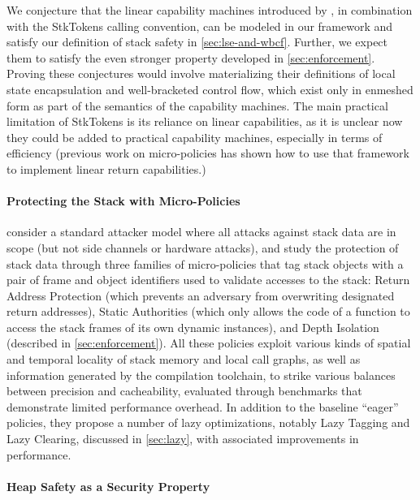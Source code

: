 \documentclass[acmsmall,review,anonymous]{acmart}\settopmatter{printfolios=true,printccs=false,printacmref=false}
\begin{document}
We conjecture that the linear capability machines introduced by
\citep{Skorstengaard+19}, in combination with the StkTokens calling convention,
can be modeled in our framework and satisfy our definition of stack safety in
\cref{sec:lse-and-wbcf}. Further, we expect them to satisfy the even stronger
property developed in \cref{sec:enforcement}. Proving these conjectures would
involve materializing their definitions of local state encapsulation and
well-bracketed control flow, which exist only in enmeshed form as part of the
semantics of the capability machines. The main practical limitation of StkTokens
is its reliance on linear capabilities, as it is unclear now they could be added
to practical capability machines, especially in terms of efficiency (previous
work on micro-policies \citep{yannis-report} has shown how to use that framework
to implement linear return capabilities.)

\paragraph{Protecting the Stack with Micro-Policies}
%
\citet{DBLP:conf/sp/RoesslerD18} consider a standard attacker model where all
attacks against stack data are in scope (but not side channels or hardware
attacks), and study the protection of stack data through three families of
micro-policies that tag stack objects with a pair of frame and object identifiers
used to validate accesses to the stack: Return Address Protection (which
prevents an adversary from overwriting designated return addresses), Static
Authorities (which only allows the code of a function to access the stack frames
of its own dynamic instances), and Depth Isolation (described in
\cref{sec:enforcement}). All these policies exploit various kinds of spatial and
temporal locality of stack memory and local call graphs, as well as information
generated by the compilation toolchain, to strike various balances between
precision and cacheability, evaluated through benchmarks that demonstrate
limited performance overhead. In addition to the baseline ``eager'' policies,
they propose a number of lazy optimizations, notably Lazy Tagging and Lazy
Clearing, discussed in \cref{sec:lazy}, with associated improvements in
performance.

\paragraph{Heap Safety as a Security Property}
\end{document}
